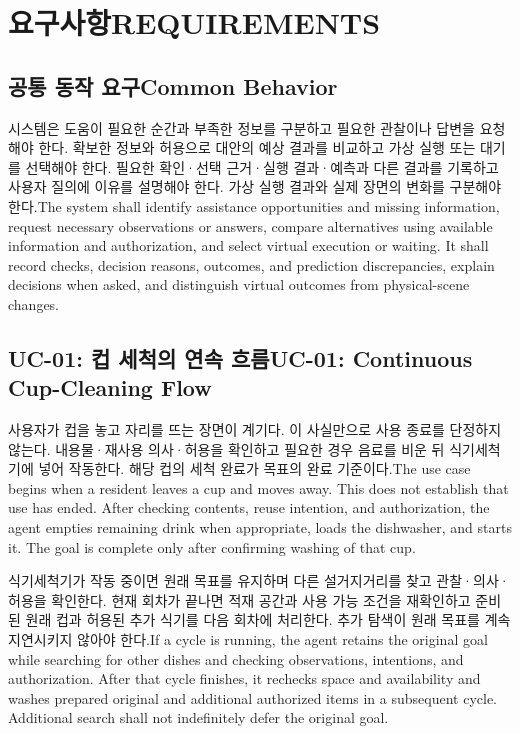 \documentclass[conference,a4paper]{IEEEtran}
\newcommand{\bi}[2]{\ifKorean#1\else#2\fi}
\begin{document}
\section{\bi{요구사항}{REQUIREMENTS}}
\subsection{\bi{공통 동작 요구}{Common Behavior}}
\bi{시스템은 도움이 필요한 순간과 부족한 정보를 구분하고 필요한 관찰이나 답변을 요청해야 한다. 확보한 정보와 허용으로 대안의 예상 결과를 비교하고 가상 실행 또는 대기를 선택해야 한다. 필요한 확인·선택 근거·실행 결과·예측과 다른 결과를 기록하고 사용자 질의에 이유를 설명해야 한다. 가상 실행 결과와 실제 장면의 변화를 구분해야 한다.}{The system shall identify assistance opportunities and missing information, request necessary observations or answers, compare alternatives using available information and authorization, and select virtual execution or waiting. It shall record checks, decision reasons, outcomes, and prediction discrepancies, explain decisions when asked, and distinguish virtual outcomes from physical-scene changes.}

\subsection{\bi{UC-01: 컵 세척의 연속 흐름}{UC-01: Continuous Cup-Cleaning Flow}}
\bi{사용자가 컵을 놓고 자리를 뜨는 장면이 계기다. 이 사실만으로 사용 종료를 단정하지 않는다. 내용물·재사용 의사·허용을 확인하고 필요한 경우 음료를 비운 뒤 식기세척기에 넣어 작동한다. 해당 컵의 세척 완료가 목표의 완료 기준이다.}{The use case begins when a resident leaves a cup and moves away. This does not establish that use has ended. After checking contents, reuse intention, and authorization, the agent empties remaining drink when appropriate, loads the dishwasher, and starts it. The goal is complete only after confirming washing of that cup.}

\bi{식기세척기가 작동 중이면 원래 목표를 유지하며 다른 설거지거리를 찾고 관찰·의사·허용을 확인한다. 현재 회차가 끝나면 적재 공간과 사용 가능 조건을 재확인하고 준비된 원래 컵과 허용된 추가 식기를 다음 회차에 처리한다. 추가 탐색이 원래 목표를 계속 지연시키지 않아야 한다.}{If a cycle is running, the agent retains the original goal while searching for other dishes and checking observations, intentions, and authorization. After that cycle finishes, it rechecks space and availability and washes prepared original and additional authorized items in a subsequent cycle. Additional search shall not indefinitely defer the original goal.}
\end{document}

